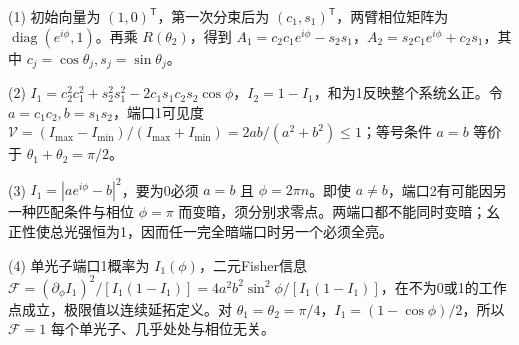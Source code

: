 (1) 初始向量为 \((1,0)^\mathsf T\)，第一次分束后为 \((c_1,s_1)^\mathsf T\)，两臂相位矩阵为 \(\operatorname{diag}(e^{i\phi},1)\)。再乘 \(R(\theta_2)\)，得到 \(A_1=c_2c_1e^{i\phi}-s_2s_1\)，\(A_2=s_2c_1e^{i\phi}+c_2s_1\)，其中 \(c_j=\cos\theta_j,s_j=\sin\theta_j\)。

(2) \(I_1=c_2^2c_1^2+s_2^2s_1^2-2c_1s_1c_2s_2\cos\phi\)，\(I_2=1-I_1\)，和为1反映整个系统幺正。令 \(a=c_1c_2,b=s_1s_2\)，端口1可见度 \(\mathcal V=(I_{\max}-I_{\min})/(I_{\max}+I_{\min})=2ab/(a^2+b^2)\le1\)；等号条件 \(a=b\) 等价于 \(\theta_1+\theta_2=\pi/2\)。

(3) \(I_1=|ae^{i\phi}-b|^2\)，要为0必须 \(a=b\) 且 \(\phi=2\pi n\)。即使 \(a\ne b\)，端口2有可能因另一种匹配条件与相位 \(\phi=\pi\) 而变暗，须分别求零点。两端口都不能同时变暗；幺正性使总光强恒为1，因而任一完全暗端口时另一个必须全亮。

(4) 单光子端口1概率为 \(I_1(\phi)\)，二元Fisher信息 \(\mathcal F=(\partial_\phi I_1)^2/[I_1(1-I_1)]=4a^2b^2\sin^2\phi/[I_1(1-I_1)]\)，在不为0或1的工作点成立，极限值以连续延拓定义。对 \(\theta_1=\theta_2=\pi/4\)，\(I_1=(1-\cos\phi)/2\)，所以 \(\mathcal F=1\) 每个单光子、几乎处处与相位无关。
